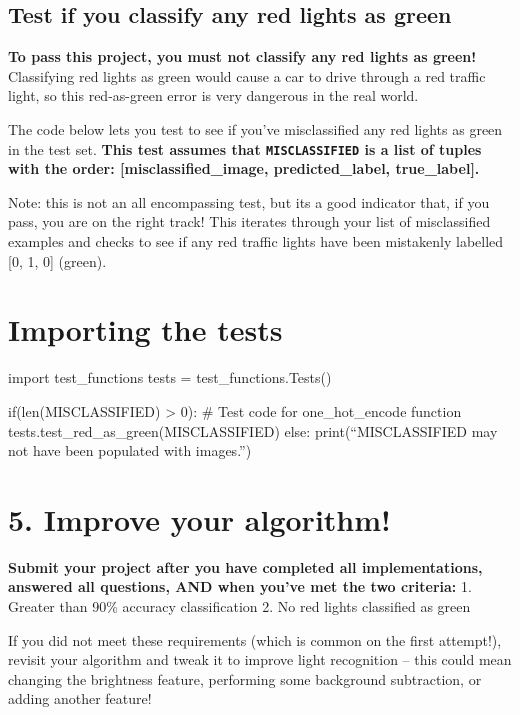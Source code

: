 \documentclass[11pt]{article}
\begin{document}
    \hypertarget{test-if-you-classify-any-red-lights-as-green}{%
\subsection{Test if you classify any red lights as
green}\label{test-if-you-classify-any-red-lights-as-green}}

\textbf{To pass this project, you must not classify any red lights as
green!} Classifying red lights as green would cause a car to drive
through a red traffic light, so this red-as-green error is very
dangerous in the real world.

The code below lets you test to see if you've misclassified any red
lights as green in the test set. \textbf{This test assumes that
\texttt{MISCLASSIFIED} is a list of tuples with the order:
{[}misclassified\_image, predicted\_label, true\_label{]}.}

Note: this is not an all encompassing test, but its a good indicator
that, if you pass, you are on the right track! This iterates through
your list of misclassified examples and checks to see if any red traffic
lights have been mistakenly labelled {[}0, 1, 0{]} (green).

    \hypertarget{importing-the-tests}{%
\section{Importing the tests}\label{importing-the-tests}}

import test\_functions tests = test\_functions.Tests()

if(len(MISCLASSIFIED) \textgreater{} 0): \# Test code for
one\_hot\_encode function tests.test\_red\_as\_green(MISCLASSIFIED)
else: print(``MISCLASSIFIED may not have been populated with images.'')

    \hypertarget{improve-your-algorithm}{%
\section{5. Improve your algorithm!}\label{improve-your-algorithm}}

\textbf{Submit your project after you have completed all
implementations, answered all questions, AND when you've met the two
criteria:} 1. Greater than 90\% accuracy classification 2. No red lights
classified as green

If you did not meet these requirements (which is common on the first
attempt!), revisit your algorithm and tweak it to improve light
recognition -- this could mean changing the brightness feature,
performing some background subtraction, or adding another feature!
\end{document}
